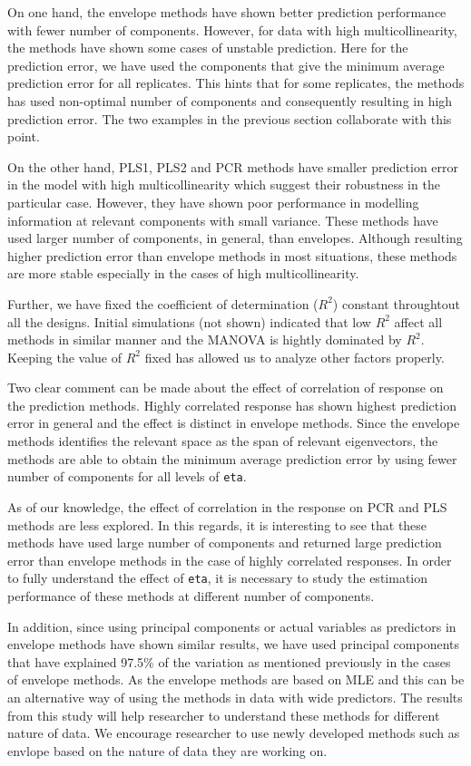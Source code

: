 \documentclass[12pt,3p,authoryear]{elsarticle}
\begin{document}
On one hand, the envelope methods have shown better prediction
performance with fewer number of components. However, for data with high
multicollinearity, the methods have shown some cases of unstable
prediction. Here for the prediction error, we have used the components
that give the minimum average prediction error for all replicates. This
hints that for some replicates, the methods has used non-optimal number
of components and consequently resulting in high prediction error. The
two examples in the previous section collaborate with this point.

On the other hand, PLS1, PLS2 and PCR methods have smaller prediction
error in the model with high multicollinearity which suggest their
robustness in the particular case. However, they have shown poor
performance in modelling information at relevant components with small
variance. These methods have used larger number of components, in
general, than envelopes. Although resulting higher prediction error than
envelope methods in most situations, these methods are more stable
especially in the cases of high multicollinearity.

Further, we have fixed the coefficient of determination (\(R^2\))
constant throughtout all the designs. Initial simulations (not shown)
indicated that low \(R^2\) affect all methods in similar manner and the
MANOVA is hightly dominated by \(R^2\). Keeping the value of \(R^2\)
fixed has allowed us to analyze other factors properly.

Two clear comment can be made about the effect of correlation of
response on the prediction methods. Highly correlated response has shown
highest prediction error in general and the effect is distinct in
envelope methods. Since the envelope methods identifies the relevant
space as the span of relevant eigenvectors, the methods are able to
obtain the minimum average prediction error by using fewer number of
components for all levels of \texttt{eta}.

As of our knowledge, the effect of correlation in the response on PCR
and PLS methods are less explored. In this regards, it is interesting to
see that these methods have used large number of components and returned
large prediction error than envelope methods in the case of highly
correlated responses. In order to fully understand the effect of
\texttt{eta}, it is necessary to study the estimation performance of
these methods at different number of components.

In addition, since using principal components or actual variables as
predictors in envelope methods have shown similar results, we have used
principal components that have explained 97.5\% of the variation as
mentioned previously in the cases of envelope methods. As the envelope
methods are based on MLE and this can be an alternative way of using the
methods in data with wide predictors. The results from this study will
help researcher to understand these methods for different nature of
data. We encourage researcher to use newly developed methods such as
envlope based on the nature of data they are working on.
\end{document}
